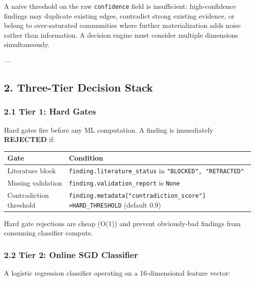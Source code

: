 A naive threshold on the raw \texttt{confidence} field is insuf\-ficient: high-confidence findings may duplicate existing edges, contradict strong existing evidence, or belong to over-saturated communities where further mater\-ialization adds noise rather than information. A decision engine must consider multiple dimensions simul\-taneously.

---

\subsection{2. Three-Tier Decision Stack}

\subsubsection{2.1 Tier 1: Hard Gates}

Hard gates fire before any ML computation. A finding is immediately \textbf{REJECTED} if:

\begin{center}
\begin{tabularx}{\columnwidth}{|>{\raggedright\arraybackslash}X|>{\raggedright\arraybackslash}X|}
\hline
Gate & Condition \\ \hline
Literature block & \texttt{finding.literature\_status} in \texttt{{"BLOCKED", "RETRACTED"}} \\ \hline
Missing validation & \texttt{finding.validation\_report} is \texttt{None} \\ \hline
Contra\-diction threshold & \texttt{finding.metadata["contradiction\_score"] \textgreater  HARD\_THRESHOLD} (default 0.9) \\ \hline
\end{tabularx}
\end{center}

Hard gate rejections are cheap (O(1)) and prevent obviously-bad findings from consuming classifier compute.

\subsubsection{2.2 Tier 2: Online SGD Classifier}

A logistic regression classifier operating on a 16-dimensional feature vector:

